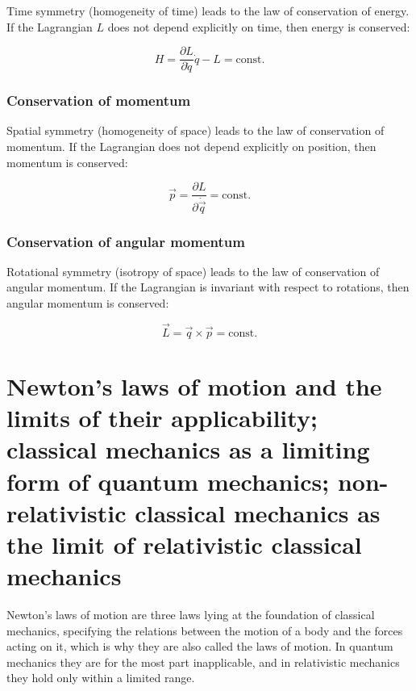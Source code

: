 Time symmetry (homogeneity of time) leads to the law of conservation of energy. If the Lagrangian \( L \) does not depend explicitly on time, then energy is conserved:

\begin{equation}
H = \frac{\partial L}{\partial \dot{q}} \dot{q} - L = \text{const}.
\end{equation}

\subsubsection{Conservation of momentum}

Spatial symmetry (homogeneity of space) leads to the law of conservation of momentum. If the Lagrangian does not depend explicitly on position, then momentum is conserved:

\begin{equation}
\vec{p} = \frac{\partial L}{\partial \dot{\vec{q}}} = \text{const}.
\end{equation}

\subsubsection{Conservation of angular momentum}

Rotational symmetry (isotropy of space) leads to the law of conservation of angular momentum. If the Lagrangian is invariant with respect to rotations, then angular momentum is conserved:

\begin{equation}
\vec{L} = \vec{q} \times \vec{p} = \text{const}.
\end{equation}

\section{Newton's laws of motion and the limits of their applicability; classical mechanics as a limiting form of quantum mechanics; non-relativistic classical mechanics as the limit of relativistic classical mechanics}

Newton's laws of motion are three laws lying at the foundation of classical mechanics, specifying the relations between the motion of a body and the forces acting on it, which is why they are also called the laws of motion. In quantum mechanics they are for the most part inapplicable, and in relativistic mechanics they hold only within a limited range.

